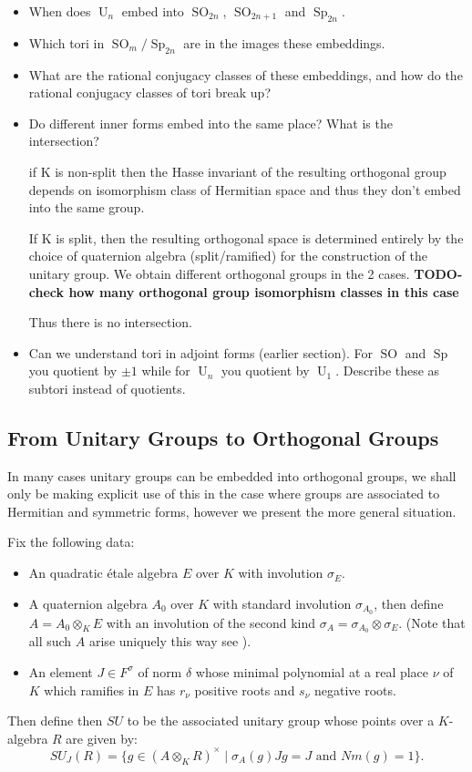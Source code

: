 \documentclass{article}
\theoremstyle{plain}
\theoremstyle{definition}
\numberwithin{equation}{section}
\DeclareMathOperator{\Sp}{Sp}
\DeclareMathOperator{\SO}{SO}
\DeclareMathOperator{\U}{U}
\newcommand{\TODO}[1]{\textbf{TODO-#1}}
\begin{document}
\begin{itemize}
\item When does $\U_n$ embed into $\SO_{2n}$, $\SO_{2n+1}$ and $\Sp_{2n}$.
\item Which tori in $\SO_m / \Sp_{2n}$ are in the images these embeddings.
\item What are the rational conjugacy classes of these embeddings, and how do the rational conjugacy classes of tori break up?
\item Do different inner forms embed into the same place?  What is the intersection?

if K is non-split then the Hasse invariant of the resulting orthogonal group depends on isomorphism class of Hermitian space and thus they don't embed into the same group.

If K is split, then the resulting orthogonal space is determined entirely by the choice of quaternion algebra (split/ramified) for the construction of the unitary group. We obtain different orthogonal groups in the 2 cases.
\TODO{check how many orthogonal group isomorphism classes in this case}

Thus there is no intersection.

\item Can we understand tori in adjoint forms (earlier section).  For $\SO$ and $\Sp$ you quotient by $\pm 1$ while for $\U_n$ you quotient by $\U_1$.  Describe these as subtori instead of quotients.
\end{itemize}

\subsection{From Unitary Groups to Orthogonal Groups}

In many cases unitary groups can be embedded into orthogonal groups, we shall only be making explicit use of this in the case where groups are associated to Hermitian and symmetric forms, however we present the more general situation.

Fix the following data:
\begin{itemize}
\item An quadratic \'etale algebra $E$ over $K$ with involution $\sigma_E$.
\item A quaternion algebra $A_0$ over $K$ with standard involution $\sigma_{A_0}$, then define $A = A_0\otimes_K E$ with an involution of the second kind $\sigma_A = \sigma_{A_0} \otimes \sigma_E$.
(Note that all such $A$ arise uniquely this way see \cite[2.22]{TODO - book of involutions}).
\item An element $J\in F^\sigma$ of norm $\delta$ whose minimal polynomial at a real place $\nu$ of $K$ which ramifies in $E$ has $r_\nu$ positive roots and $s_\nu$ negative roots.
\end{itemize}
Then define then $SU$ to be the associated unitary group whose points over a $K$-algebra $R$ are given by:
\[ SU_J(R) = \{ g\in (A\otimes_K R)^\times \mid \sigma_A(g)Jg = J \text{ and } Nm(g) = 1 \}. \]
\end{document}
